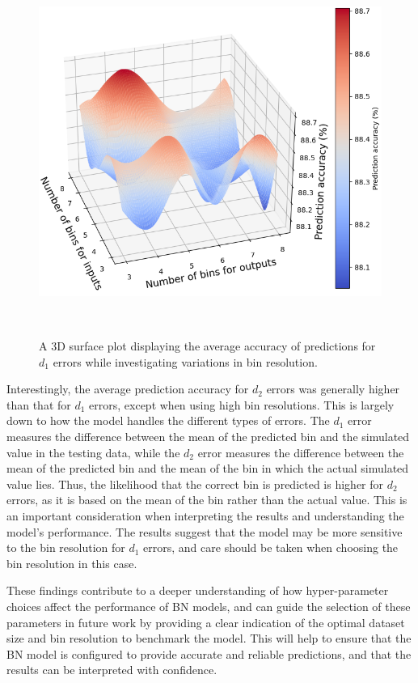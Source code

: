 \documentclass[journal]{IEEEtran}
\begin{document}
\begin{figure}[h]
    \centering
    \includegraphics[width=0.9\columnwidth]{figures/validation_plots/PROCESS/SA_3D_trimmed_39.png}
    \caption{\small A 3D surface plot displaying the average accuracy of predictions for $d_{1}$ errors while investigating variations in bin resolution.}~\label{fig:3D_SA_trimmed_39_D1}
\end{figure}

Interestingly, the average prediction accuracy for $d_{2}$ errors was generally higher than that for $d_{1}$ errors, except when using high bin resolutions. This is largely down to how the model handles the different types of errors. The $d_{1}$ error measures the difference between the mean of the predicted bin and the simulated value in the testing data, while the $d_{2}$ error measures the difference between the mean of the predicted bin and the mean of the bin in which the actual simulated value lies. Thus, the likelihood that the correct bin is predicted is higher for $d_{2}$ errors, as it is based on the mean of the bin rather than the actual value. This is an important consideration when interpreting the results and understanding the model's performance. The results suggest that the model may be more sensitive to the bin resolution for $d_{1}$ errors, and care should be taken when choosing the bin resolution in this case.

These findings contribute to a deeper understanding of how hyper-parameter choices affect the performance of BN models, and can guide the selection of these parameters in future work by providing a clear indication of the optimal dataset size and bin resolution to benchmark the model. This will help to ensure that the BN model is configured to provide accurate and reliable predictions, and that the results can be interpreted with confidence.
\end{document}
